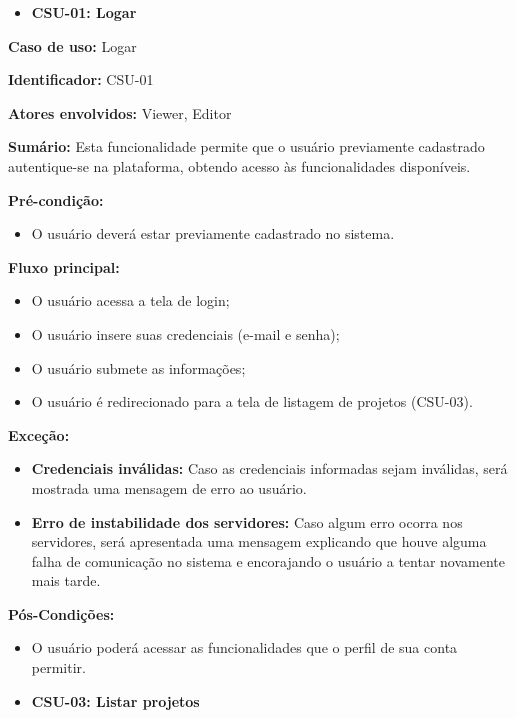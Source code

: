 \begin{itemize}
    \item \textbf{CSU-01: Logar}
\end{itemize}

\textbf{Caso de uso:} Logar

\textbf{Identificador:} CSU-01

\textbf{Atores envolvidos:} Viewer, Editor

\textbf{Sumário:} Esta funcionalidade permite que o usuário previamente cadastrado autentique-se na plataforma, obtendo acesso às funcionalidades disponíveis.

\textbf{Pré-condição:}
\begin{itemize}
    \item O usuário deverá estar previamente cadastrado no sistema.
\end{itemize}

\textbf{Fluxo principal:}
\begin{itemize}
    \item O usuário acessa a tela de login;
    \item O usuário insere suas credenciais (e-mail e senha);
    \item O usuário submete as informações;
    \item O usuário é redirecionado para a tela de listagem de projetos (CSU-03).
\end{itemize}

\textbf{Exceção:}
\begin{itemize}
    \item \textbf{Credenciais inválidas:} Caso as credenciais informadas sejam inválidas, será mostrada uma mensagem de erro ao usuário.
    \item \textbf{Erro de instabilidade dos servidores:} Caso algum erro ocorra nos servidores, será apresentada uma mensagem explicando que houve alguma falha de comunicação no sistema e encorajando o usuário a tentar novamente mais tarde.
\end{itemize}

\textbf{Pós-Condições:}
\begin{itemize}
    \item O usuário poderá acessar as funcionalidades que o perfil de sua conta permitir.
\end{itemize}

\vspace{1em}

\begin{itemize}
    \item \textbf{CSU-03: Listar projetos}
\end{itemize}

